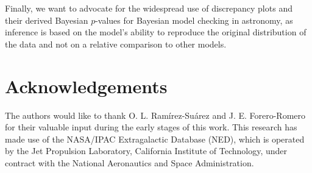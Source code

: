 \documentclass[a4paper,fleqn,usenatbib]{mnras}
\begin{document}
Finally, we want to advocate for the widespread use of discrepancy plots and their derived Bayesian $p$-values for  Bayesian model checking in astronomy, as inference is based on the model's ability to reproduce the original distribution of the data and not on a relative comparison to other models.



\section*{Acknowledgements}

The authors would like to thank O. L. Ram\'irez-Su\'arez and J. E. Forero-Romero for their valuable input during the early stages of this work. This research has made use of the NASA/IPAC Extragalactic Database (NED), which is operated by the Jet Propulsion Laboratory, California Institute of Technology, under contract with the National Aeronautics and Space Administration.










\appendix
\end{document}
